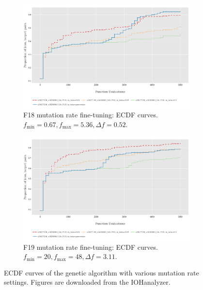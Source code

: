 \documentclass{article}
\begin{document}
\begin{figure}[!ht]
    \begin{subfigure}[h]{0.95\linewidth}
        \includegraphics[width=\linewidth]{ga/f18/mrate_ecdf.png}
        \caption{F18 mutation rate fine-tuning: ECDF curves. $f_{\min} = 0.67, f_{\max} = 5.36, \Delta f = 0.52$.}
    \end{subfigure}
    \hfill
    \begin{subfigure}[h]{0.95\linewidth}
        \includegraphics[width=\linewidth]{ga/f19/mrate_ecdf.png}
        \caption{F19 mutation rate fine-tuning: ECDF curves. $f_{\min} = 20, f_{\max} = 48, \Delta f = 3.11$.}
    \end{subfigure}
    \caption{ECDF curves of the genetic algorithm with various mutation rate settings. Figures are downloaded from the IOHanalyzer.}
    \label{fig:experi-ga-mrate-ecdf}
\end{figure}
\end{document}
